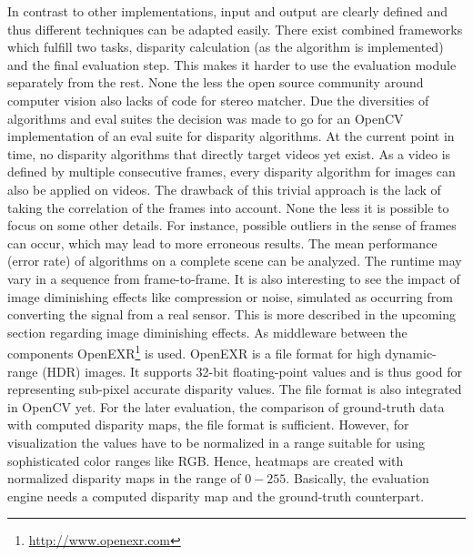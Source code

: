 In contrast to other implementations, input and output are clearly defined and thus different techniques can be adapted easily.
There exist combined frameworks which fulfill two tasks, disparity calculation (as the algorithm is implemented) and the final evaluation step.
This makes it harder to use the evaluation module separately from the rest.
None the less the open source community around computer vision also lacks of code for stereo matcher.
Due the diversities of algorithms and eval suites the decision was made to go for an OpenCV implementation of an eval suite for disparity algorithms.
\newline\newline\noindent At the current point in time, no disparity algorithms that directly target videos yet exist.
As a video is defined by multiple consecutive frames, every disparity algorithm for images can also be applied on videos.
The drawback of this trivial approach is the lack of taking the correlation of the frames into account.
None the less it is possible to focus on some other details.
\newline\newline\noindent For instance, possible outliers in the sense of frames can occur, which may lead to more erroneous results.
The mean performance (error rate) of algorithms on a complete scene can be analyzed.
The runtime may vary in a sequence from frame-to-frame.
It is also interesting to see the impact of image diminishing effects like compression or noise, simulated as occurring from converting the signal from a real sensor.
This is more described in the upcoming section regarding image diminishing effects.
\newline\newline\noindent As middleware between the components OpenEXR\footnote{\url{http://www.openexr.com}} is used.
OpenEXR is a file format for high dynamic-range (HDR) images.
It supports 32-bit floating-point values and is thus good for representing sub-pixel accurate disparity values.
The file format is also integrated in OpenCV yet.
For the later evaluation, the comparison of ground-truth data with computed disparity maps, the file format is sufficient.
However, for visualization the values have to be normalized in a range suitable for using sophisticated color ranges like RGB.
Hence, heatmaps are created with normalized disparity maps in the range of $0-255$.
\newline\newline\noindent Basically, the evaluation engine needs a computed disparity map and the ground-truth counterpart.

